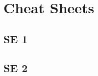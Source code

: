 \part{Cheat Sheets}


\chapter{SE 1}

\clearpage


\chapter{SE 2}

\clearpage




\clearpage


\clearpage


\clearpage


\clearpage


\clearpage